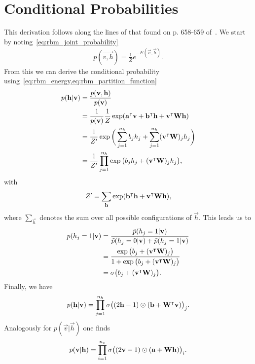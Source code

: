 \section{Conditional Probabilities}\label{app:conditional_probabilities_derivation}
This derivation follows along the lines of that found on p. 658-659 of~\cite{goodfellow_deep_learning}.
We start by noting~\cref{eq:rbm_joint_probability}
\begin{align}
    p(\vec{v,h}) = \frac{1}{Z} e^{-E(\vec{v},\vec{h})}.
\end{align}
From this we can derive the conditional probability using~\cref{eq:rbm_energy,eq:rbm_partition_function}
\begin{align}
\begin{split}
    p(\mathbf{h} | \mathbf{v})
        &= \frac{p(\mathbf{v},\mathbf{h})}{p(\mathbf{v})} \\
        &= \frac{1}{p(\mathbf{v})} \frac{1}{Z} \exp( \mathbf{a}^\intercal\mathbf{v} + \mathbf{b}^\intercal\mathbf{h} + \mathbf{v}^\intercal\mathbf{W}\mathbf{h} ) \\
        &= \frac{1}{Z'} \exp\bigg( \sum_{j=1}^{n_h} b_j h_j + \sum_{j=1}^{n_h} (\mathbf{v}^\intercal\mathbf{W})_j h_j \bigg) \\
        &= \frac{1}{Z'} \prod_{j=1}^{n_h} \exp\big( b_j h_j + (\mathbf{v}^\intercal\mathbf{W})_j h_j \big),
\end{split}
\end{align}
with
\begin{align}
    Z' = \sum_{\mathbf{h}} \exp( \mathbf{b}^\intercal\mathbf{h} + \mathbf{v}^\intercal\mathbf{W}\mathbf{h} ),
\end{align}
where \( \sum_{\vec{h}} \) denotes the sum over all possible configurations of \( \vec{h} \).
This leads us to
\begin{align}
\begin{split}
    p(h_j = 1 | \mathbf{v})
        &= \frac{\tilde{p}(h_j = 1 | \mathbf{v})}{\tilde{p}(h_j = 0 | \mathbf{v}) + \tilde{p}(h_j = 1 | \mathbf{v})} \\
        &= \frac{\exp\big( b_j + (\mathbf{v}^\intercal\mathbf{W})_j \big)}{1 + \exp\big( b_j + (\mathbf{v}^\intercal\mathbf{W})_j \big)} \\
        &= \sigma\big( b_j + (\mathbf{v}^\intercal\mathbf{W})_j \big).
\end{split}
\end{align}
Finally, we have
\begin{align}
    p(\mathbf{h} | \mathbf{v}) = \prod_{j=1}^{n_h} \sigma\big( (2\mathbf{h} - 1) \odot (\mathbf{b} + \mathbf{W}^\intercal\mathbf{v}) \big)_j.
\end{align}
Analogously for \( p(\vec{v} | \vec{h}) \) one finds
\begin{align}
    p(\mathbf{v} | \mathbf{h}) = \prod_{i=1}^{n_v} \sigma\big( (2\mathbf{v} - 1) \odot (\mathbf{a} + \mathbf{W}\mathbf{h}) \big)_i.
\end{align}

